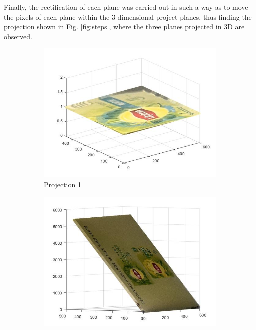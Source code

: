 \documentclass[12pt, twoside]{report}
\begin{document}
\begin{enumerate}
Finally, the rectification of each plane was carried out in such a way as to move the pixels of each plane within the 3-dimensional project planes, thus finding the projection shown in Fig. \ref{fig:steps}, where the three planes projected in 3D are observed.
\begin{figure}[H]
     \centering
     \begin{subfigure}[b]{0.3\textwidth}
         \centering
         \includegraphics[width=\textwidth]{images/tp_3/face1.jpg}
         \caption{Projection 1}
         \label{fig:face1}
     \end{subfigure}
     \hfill
     \begin{subfigure}[b]{0.3\textwidth}
         \centering
         \includegraphics[width=\textwidth]{images/tp_3/face2.jpg}

\end{subfigure}
\end{figure}
\end{enumerate}
\end{document}
